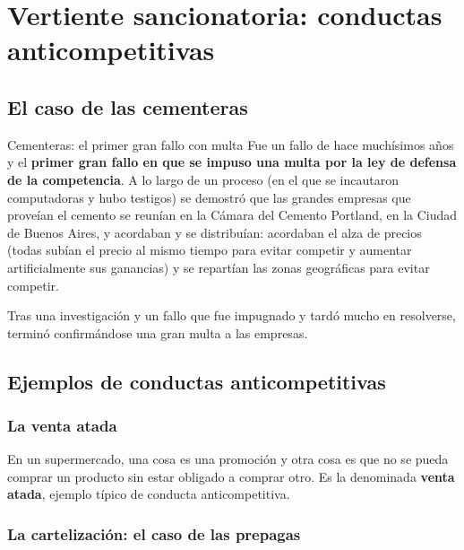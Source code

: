 \documentclass[12pt,oneside]{book}
\begin{document}
\chapter[Vertiente sancionatoria: conductas anticompetitivas]{Vertiente sancionatoria: conductas anticompetitivas}

\section{El caso de las cementeras}

\begin{example}{Cementeras: el primer gran fallo con multa}
Fue un fallo de hace muchísimos años y el \textbf{primer gran fallo en que se impuso una multa por la ley de defensa de la competencia}. A lo largo de un proceso (en el que se incautaron computadoras y hubo testigos) se demostró que las grandes empresas que proveían el cemento se reunían en la Cámara del Cemento Portland, en la Ciudad de Buenos Aires, y acordaban y se distribuían: acordaban el alza de precios (todas subían el precio al mismo tiempo para evitar competir y aumentar artificialmente sus ganancias) y se repartían las zonas geográficas para evitar competir.
\end{example}

Tras una investigación y un fallo que fue impugnado y tardó mucho en resolverse, terminó confirmándose una gran multa a las empresas.

\section{Ejemplos de conductas anticompetitivas}

\subsection{La venta atada}

En un supermercado, una cosa es una promoción y otra cosa es que no se pueda comprar un producto sin estar obligado a comprar otro. Es la denominada \textbf{venta atada}, ejemplo típico de conducta anticompetitiva.

\subsection{La cartelización: el caso de las prepagas}
\end{document}
